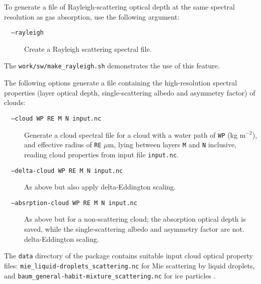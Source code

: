 \documentclass[twoside]{article}
\def\codesize{\small}
\def\code#1{{\codesize\texttt{#1}}}
\def\citem#1{\item[{\codesize\texttt{#1}}]}
\begin{document}
To generate a file of Rayleigh-scattering optical depth at the same
spectral resolution as gas absorption, use the following argument:
\begin{description}
\citem{~~--rayleigh} Create a Rayleigh scattering spectral file.
\end{description}
The \code{work/sw/make\_rayleigh.sh} demonstrates the use of this
feature.

The following options generate a file containing the high-resolution
spectral properties (layer optical depth, single-scattering albedo and
asymmetry factor) of clouds:
\begin{description}
\citem{~~--cloud WP RE M N input.nc} Generate a cloud spectral file
for a cloud with a water path of \code{WP} (kg m$^{-2}$), and
effective radius of \code{RE} $\mu$m, lying between layers \code{M}
and \code{N} inclusive, reading cloud properties from input file
\code{input.nc}.
%
\citem{~~--delta-cloud WP RE M N input.nc} As above but also apply
delta-Eddington scaling.
%
\citem{~~--absrption-cloud WP RE M N input.nc} As above but for a
non-scattering cloud; the absorption optical depth is saved, while the
single-scattering albedo and asymmetry factor are not.
delta-Eddington scaling.
\end{description}
The \code{data} directory of the package contains suitable input cloud
optical property files: \code{mie\_liquid-droplets\_scattering.nc} for Mie
scattering by liquid droplets, and
\code{baum\_general-habit-mixture\_scattering.nc} for ice particles
\citep{Baum+2014}.
\end{document}
